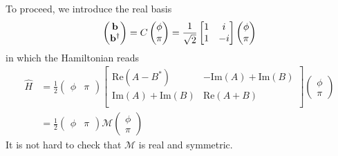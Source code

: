 To proceed, we introduce the real basis 
\begin{equation}\begin{aligned}
\label{eq:real_basis}
\begin{pmatrix}
{\bf b}\\
{\bf b}^\dagger
\end{pmatrix}
=C\begin{pmatrix}
\phi\\
\pi
\end{pmatrix}
=\frac{1}{\sqrt{2}}\begin{bmatrix}
1 & i \\
1 & -i
\end{bmatrix}\begin{pmatrix}
\phi\\
\pi
\end{pmatrix}
\end{aligned}\end{equation}
in which the Hamiltonian reads
\begin{equation}\begin{aligned}
\hat{H}
&=\frac{1}{2}
\begin{pmatrix}
\phi & \pi
\end{pmatrix}
\begin{bmatrix}
\text{Re}(A-B^*) & -\text{Im}(A)+\text{Im}(B)\\
\text{Im}(A)+\text{Im}(B)& \text{Re}(A+B) \\
\end{bmatrix}
\begin{pmatrix}
\phi\\
\pi
\end{pmatrix} \\
&=\frac{1}{2}
\begin{pmatrix}
\phi & \pi
\end{pmatrix}
\mathcal{M}
\begin{pmatrix}
\phi\\
\pi
\end{pmatrix}
\end{aligned}\end{equation}
It is not hard to check that $\mathcal{M}$ is real and symmetric. 

